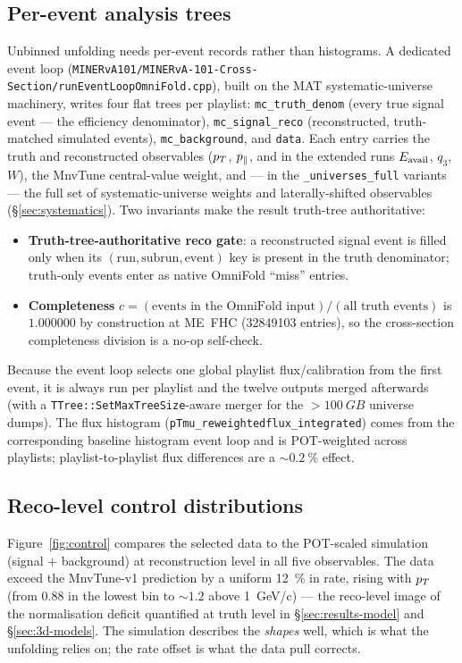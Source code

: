 \subsection{Per-event analysis trees}
\label{sec:evloop}
Unbinned unfolding needs per-event records rather than histograms. A dedicated
event loop
(\texttt{MINERvA101/MINERvA-101-Cross-Section/runEventLoopOmniFold.cpp}),
built on the MAT systematic-universe machinery, writes four flat trees per
playlist: \texttt{mc\_truth\_denom} (every true signal event --- the
efficiency denominator), \texttt{mc\_signal\_reco} (reconstructed,
truth-matched simulated events), \texttt{mc\_background}, and \texttt{data}.
Each entry carries the truth and reconstructed observables
($p_{T}$, $p_{\parallel}$, and in the extended runs $E_{\mathrm{avail}}$, $q_{3}$, $W$), the
MnvTune central-value weight, and --- in the \texttt{\_universes\_full}
variants --- the full set of systematic-universe weights and
laterally-shifted observables (\S\ref{sec:systematics}). Two invariants make
the result truth-tree authoritative:
\begin{itemize}
  \item \textbf{Truth-tree-authoritative reco gate}: a reconstructed signal
        event is filled only when its
        $(\mathrm{run},\mathrm{subrun},\mathrm{event})$ key is present in the
        truth denominator; truth-only events enter as native OmniFold
        ``miss'' entries.
  \item \textbf{Completeness} $c = (\text{events in the OmniFold
        input})/(\text{all truth events})$ is $1.000000$ by construction at
        ME~FHC (\num{32849103} entries), so the cross-section completeness
        division is a no-op self-check.
\end{itemize}
Because the event loop selects one global playlist flux/calibration from the
first event, it is always run per playlist and the twelve outputs merged
afterwards (with a \texttt{TTree::SetMaxTreeSize}-aware merger for the
$>\SI{100}{GB}$ universe dumps). The flux histogram
(\texttt{pTmu\_reweightedflux\_integrated}) comes from the corresponding
baseline histogram event loop and is POT-weighted across playlists;
playlist-to-playlist flux differences are a $\sim\SI{0.2}{\percent}$ effect.

\subsection{Reco-level control distributions}
\label{sec:controlplots}
Figure~\ref{fig:control} compares the selected data to the POT-scaled
simulation (signal $+$ background) at reconstruction level in all five
observables. The data exceed the MnvTune-v1 prediction by a uniform
\SI{12}{\percent} in rate, rising with $p_{T}$ (from $0.88$ in the lowest bin
to $\sim1.2$ above \SI{1}{GeV/c}) --- the reco-level image of the
normalisation deficit quantified at truth level in
\S\ref{sec:results-model} and \S\ref{sec:3d-models}. The simulation
describes the \emph{shapes} well, which is what the unfolding relies on; the
rate offset is what the data pull corrects.

